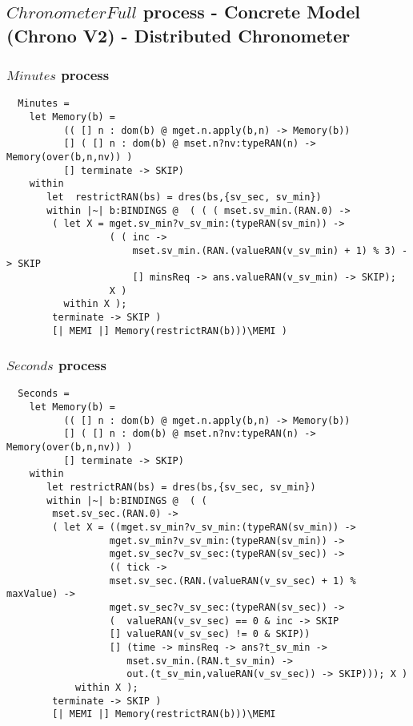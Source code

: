 \subsection{$ChronometerFull$ process - Concrete Model (Chrono V2) - Distributed Chronometer}
\subsubsection{$Minutes$ process}
\begin{verbatim}
  Minutes =
    let Memory(b) =
          (( [] n : dom(b) @ mget.n.apply(b,n) -> Memory(b))
          [] ( [] n : dom(b) @ mset.n?nv:typeRAN(n) -> Memory(over(b,n,nv)) )
          [] terminate -> SKIP)
    within
       let  restrictRAN(bs) = dres(bs,{sv_sec, sv_min})
       within |~| b:BINDINGS @  ( ( ( mset.sv_min.(RAN.0) ->
        ( let X = mget.sv_min?v_sv_min:(typeRAN(sv_min)) ->
                  ( ( inc ->
                      mset.sv_min.(RAN.(valueRAN(v_sv_min) + 1) % 3) -> SKIP
                      [] minsReq -> ans.valueRAN(v_sv_min) -> SKIP);
                  X )
          within X );
        terminate -> SKIP )
        [| MEMI |] Memory(restrictRAN(b)))\MEMI )
\end{verbatim}
\subsubsection{$Seconds$ process}

\begin{verbatim}
  Seconds =
    let Memory(b) =
          (( [] n : dom(b) @ mget.n.apply(b,n) -> Memory(b))
          [] ( [] n : dom(b) @ mset.n?nv:typeRAN(n) -> Memory(over(b,n,nv)) )
          [] terminate -> SKIP)
    within
       let restrictRAN(bs) = dres(bs,{sv_sec, sv_min})
       within |~| b:BINDINGS @  ( (
        mset.sv_sec.(RAN.0) ->
        ( let X = ((mget.sv_min?v_sv_min:(typeRAN(sv_min)) ->
                  mget.sv_min?v_sv_min:(typeRAN(sv_min)) ->
                  mget.sv_sec?v_sv_sec:(typeRAN(sv_sec)) ->
                  (( tick ->
                  mset.sv_sec.(RAN.(valueRAN(v_sv_sec) + 1) % maxValue) ->
                  mget.sv_sec?v_sv_sec:(typeRAN(sv_sec)) ->
                  (  valueRAN(v_sv_sec) == 0 & inc -> SKIP
                  [] valueRAN(v_sv_sec) != 0 & SKIP))
                  [] (time -> minsReq -> ans?t_sv_min ->
                     mset.sv_min.(RAN.t_sv_min) ->
                     out.(t_sv_min,valueRAN(v_sv_sec)) -> SKIP))); X )
            within X );
        terminate -> SKIP )
        [| MEMI |] Memory(restrictRAN(b)))\MEMI
\end{verbatim}
